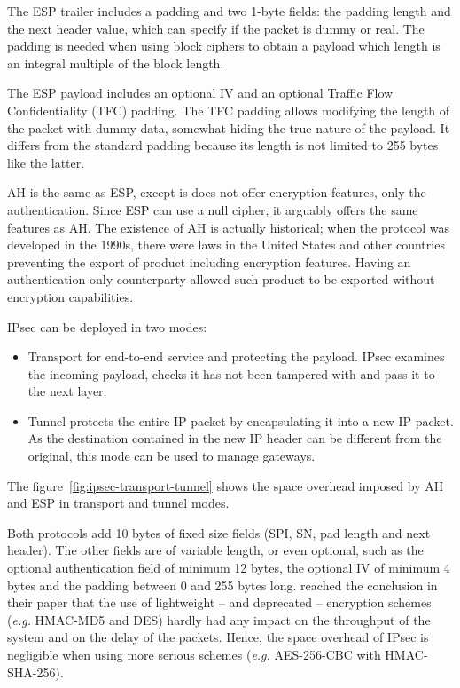 \noindent The ESP trailer includes a padding and two 1-byte fields: the padding length and the next header value, which can specify if the packet is dummy or real.
The padding is needed when using block ciphers to obtain a payload which length is an integral multiple of the block length.

\noindent The ESP payload includes an optional IV and an optional Traffic Flow Confidentiality (TFC) padding.
The TFC padding allows modifying the length of the packet with dummy data, somewhat hiding the true nature of the payload.
It differs from the standard padding because its length is not limited to 255 bytes like the latter.

\noindent AH is the same as ESP, except is does not offer encryption features, only the authentication.
Since ESP can use a null cipher, it arguably offers the same features as AH.
The existence of AH is actually historical; when the protocol was developed in the 1990s, there were laws in the United States and other countries preventing the export of product including encryption features.
Having an authentication only counterparty allowed such product to be exported without encryption capabilities.\newline{}

IPsec can be deployed in two modes: 
\begin{itemize}
	\item Transport for end-to-end service and protecting the payload. IPsec examines the incoming payload, checks it has not been tampered with and pass it to the next layer.
	\item Tunnel protects the entire IP packet by encapsulating it into a new IP packet. As the destination contained in the new IP header can be different from the original, this mode can be used to manage gateways.
\end{itemize}
The figure~\ref{fig:ipsec-transport-tunnel} shows the space overhead imposed by AH and ESP in transport and tunnel modes.

Both protocols add 10 bytes of fixed size fields (SPI, SN, pad length and next header).
The other fields are of variable length, or even optional, such as the optional authentication field of minimum 12 bytes, the optional IV of minimum 4 bytes and the padding between 0 and 255 bytes long.
\citet{Xenakis20063225} reached the conclusion in their paper that the use of lightweight -- and deprecated -- encryption schemes (\textit{e.g.} HMAC-MD5 and DES) hardly had any impact on the throughput of the system and on the delay of the packets.
Hence, the space overhead of IPsec is negligible when using more serious schemes (\textit{e.g.} AES-256-CBC with HMAC-SHA-256).


